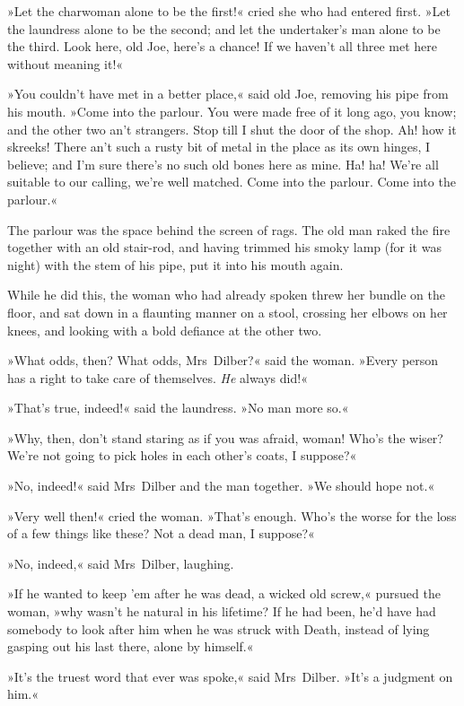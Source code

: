 »Let the charwoman alone to be the first!« cried she who had en\-tered first. »Let the laundress alone to be the second; and let the undertaker's man alone to be the third. Look here, old Joe, here's a chance! If we haven't all three met here without meaning it!«

»You couldn't have met in a better place,« said old Joe, removing his pipe from his mouth. »Come into the parlour. You were made free of it long ago, you know; and the other two an't strangers. Stop till I shut the door of the shop. Ah! how it skreeks! There an't such a rusty bit of metal in the place as its own hinges, I believe; and I'm sure there's no such old bones here as mine. Ha! ha! We're all suitable to our calling, we're well matched. Come into the parlour. Come into the parlour.«

The parlour was the space behind the screen of rags. The old man raked the fire together with an old stair-rod, and having  trimmed his smoky lamp (for it was night) with the stem of his pipe, put it into his mouth again.

While he did this, the woman who had already spoken threw her bundle on the floor, and sat down in a flaunting manner on a stool, crossing her elbows on her knees, and looking with a bold defiance at the other two.

»What odds, then? What odds, Mrs~Dilber?« said the woman. »Every person has a right to take care of themselves. \textit{He} always did!«

»That's true, indeed!« said the laundress. »No man more so.«

»Why, then, don't stand staring as if you was afraid, woman! Who's the wiser? We're not going to pick holes in each other's coats, I suppose?«

»No, indeed!« said Mrs~Dilber and the man together. »We should hope not.«

»Very well then!« cried the woman. »That's enough. Who's the worse for the loss of a few things like these? Not a dead man, I suppose?«

»No, indeed,« said Mrs~Dilber, laughing.

»If he wanted to keep 'em after he was dead, a wicked old screw,« pursued the woman, »why wasn't he natural in his lifetime? If he had been, he'd have had somebody to look after him when he was struck with Death, instead of lying gasping out his last there, alone by himself.«

»It's the truest word that ever was spoke,« said Mrs~Dilber. »It's a judgment on him.«

